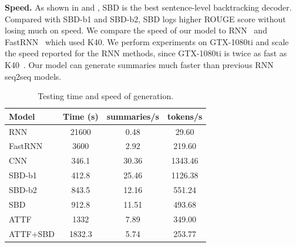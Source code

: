 \textbf{Speed.} 
As shown in  and , 
SBD is the best sentence-level backtracking decoder.
Compared with SBD-b1 and SBD-b2,
SBD logs higher ROUGE score without losing much on speed. 
We compare the speed of our model to RNN~\cite{SeeLM17} and FastRNN~\cite{P18-1063}
which used K40. 
We perform experiments on GTX-1080ti and scale the speed 
reported for the RNN methods,
since GTX-1080ti is twice as fast as K40~\cite{gehring2017convs2s}.
Our model can 
generate summaries much faster than previous RNN seq2seq models.
\begin{table}[th]
\centering
\scriptsize
\begin{tabular}{|l|c|c|c|}
\hline
Model & Time (s) & summaries/s & tokens/s \\
\hline
RNN  &  21600 & 0.48 & 29.60 \\
FastRNN &  3600 & 2.92 & 219.60 \\
\hline
CNN &  346.1 & 30.36 & 1343.46 \\
SBD-b1 &  412.8 & 25.46 & 1126.38 \\
SBD-b2 &  843.5 & 12.16 & 551.24 \\
SBD &  912.8 & 11.51 & 493.68 \\
ATTF & 1332 & 7.89 &  349.00 \\
ATTF+SBD & 1832.3 & 5.74 &  253.77 \\
\hline
\end{tabular}
\caption{Testing time and speed of generation.}
\label{tab:eval_speed}
\end{table}
